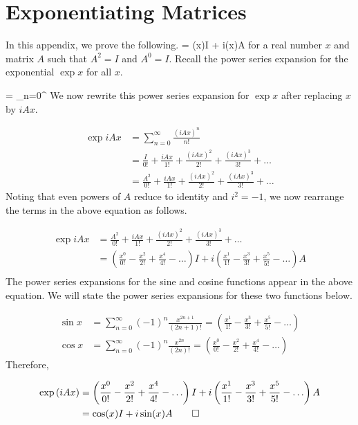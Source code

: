 \chapter{Exponentiating Matrices\label{ch:expmtx}}

In this appendix, we prove the following.
\beq
{} = \cos(x)I + i\sin(x)A
\eeq
for a real number $x$ and matrix $A$ such that $A^2 = I$ and $A^0 = I$. Recall the power series expansion for the exponential $\exp{x}$ for all $x$.

\beq
{} = \sum\limits_{n=0}^{\infty} 
\eeq
We now rewrite this power series expansion for $\exp{x}$ after replacing $x$ by $iAx$.

\begin{align}
\exp{iAx} &= \sum\limits_{n=0}^{\infty}\frac{\left(iAx\right)^n}{n!}\\
&= \frac{I}{0!} + \frac{iAx}{1!} + \frac{\left(iAx\right)^2}{2!} + \frac{\left(iAx\right)^3}{3!} + \ldots\\
&= \frac{A^2}{0!} + \frac{iAx}{1!} + \frac{\left(iAx\right)^2}{2!} + \frac{\left(iAx\right)^3}{3!} + \ldots
\end{align}
Noting that even powers of $A$ reduce to identity and $i^2 = -1$, we now rearrange the terms in the above equation as follows.

\begin{align}
\exp{iAx} &= \frac{A^2}{0!} + \frac{iAx}{1!} + \frac{\left(iAx\right)^2}{2!} + \frac{\left(iAx\right)^3}{3!} + \ldots\\
&= \left(\frac{x^0}{0!} - \frac{x^2}{2!} + \frac{x^4}{4!} - \ldots \right)I + i\left(\frac{x^1}{1!} - \frac{x^3}{3!} + \frac{x^5}{5!} - \ldots \right)A\\
\end{align}
The power series expansions for the sine and cosine functions appear in the above equation. We will state the power series expansions for these two functions below.

\begin{align}
\sin x &= \sum\limits_{n=0}^{\infty} \left(-1\right)^n\frac{x^{2n+1}}{\left(2n+1\right)!} = \left(\frac{x^1}{1!} - \frac{x^3}{3!} + \frac{x^5}{5!} - \ldots \right)\\
\cos x &= \sum\limits_{n=0}^{\infty} \left(-1\right)^n\frac{x^{2n}}{\left(2n\right)!} = \left(\frac{x^0}{0!} - \frac{x^2}{2!} + \frac{x^4}{4!} - \ldots \right)
\end{align}
Therefore,

\begin{align}
\exp{iAx} &= \left(\frac{x^0}{0!} - \frac{x^2}{2!} + \frac{x^4}{4!} - \ldots \right)I + i\left(\frac{x^1}{1!} - \frac{x^3}{3!} + \frac{x^5}{5!} - \ldots \right)A\\
&= \cos(x)I + i\sin(x)A\qed
\end{align}
